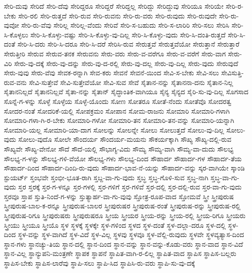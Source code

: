 {ಸೇರಿ-ದುವು
ಸೇರಿದೆ
ಸೇರಿ-ದೆವು
ಸೇರಿದ್ದರೂ
ಸೇರಿದ್ದರೆ
ಸೇರಿದ್ದಲ್ಲ
ಸೇರಿದ್ದು
ಸೇರಿದ್ದುವು
ಸೇರಿಯೂ
ಸೇರಿಯೇ
ಸೇರಿ-ರ-ಬೇಕು
ಸೇರಿ-ರಲಿ
ಸೇರಿ-ರುತ್ತದೆ
ಸೇರಿ-ರುವ
ಸೇರಿ-ರುವನು
ಸೇರಿ-ರು-ವರು
ಸೇರಿ-ರುವುದು
ಸೇರಿ-ರುವುದೇ
ಸೇರಿ-ರು-ವುವೋ
ಸೇರಿ-ರು-ವೆವು
ಸೇರಿಲ್ಲ
ಸೇರಿಲ್ಲ-ವೆಂದು
ಸೇರಿವೆ
ಸೇರಿ-ಸ-ಬಹುದು
ಸೇರಿ-ಸ-ಲಾರಿರಿ
ಸೇರಿ-ಸಲು
ಸೇರಿಸಿ
ಸೇರಿ-ಸಿ-ಕೊಳ್ಳಲು
ಸೇರಿ-ಸಿ-ಕೊಳ್ಳು-ವಷ್ಟು
ಸೇರಿ-ಸಿ-ಕೊಳ್ಳು-ವು-ದಿಲ್ಲ
ಸೇರಿ-ಸಿ-ಕೊಳ್ಳು-ವುದು
ಸೇರಿ-ಸಿ-ದಂತಿ-ರುತ್ತದೆ
ಸೇರಿ-ಸಿ-ದಂತೆ
ಸೇರಿ-ಸಿ-ದರು
ಸೇರಿ-ಸಿ-ದರೂ
ಸೇರಿ-ಸಿ-ದರೆ
ಸೇರಿಸಿ-ರುವ
ಸೇರುತ್ತವೆ
ಸೇರುತ್ತವೆಯೋ
ಸೇರುತ್ತಾನೆ
ಸೇರುತ್ತಾರೆ
ಸೇರುತ್ತೀರಿ
ಸೇರುವ
ಸೇರುವ-ತನಕ
ಸೇರುವನು
ಸೇರು-ವರು
ಸೇರು-ವ-ವರೆಗೂ
ಸೇರು-ವ-ವರೆಗೆ
ಸೇರು-ವಾಗ
ಸೇರು-ವಿರಿ
ಸೇರು-ವು-ದಕ್ಕೆ
ಸೇರು-ವು-ದನ್ನು
ಸೇರು-ವು-ದ-ರಲ್ಲಿ
ಸೇರು-ವು-ದಲ್ಲ
ಸೇರು-ವು-ದಿಲ್ಲ
ಸೇರು-ವುದು
ಸೇರುವುದೆ
ಸೇರು-ವುವು
ಸೇರು-ವೆವು
ಸೇವಕ-ರನ್ನಾಗಿ
ಸೇವ-ಕರು
ಸೇವನೆ
ಸೇವನೆ-ಯಿಂದ
ಸೇವಿ-ಸ-ಬೇಕು
ಸೇವಿ-ಸಲು
ಸೇವಿಸುತ್ತಿ-ರುವ-ವನು
ಸೇವಿ-ಸುತ್ತೇವೆ
ಸೇವಿ-ಸುತ್ತೇವೆಯೋ
ಸೇವಿ-ಸುವ
ಸೇವೆ
ಸೈತಾನ-ನನ್ನು
ಸೈತಾನನಾ-ದನು
ಸೈತಾನ-ನಿಲ್ಲ
ಸೈತಾನನಿಲ್ಲದೆ
ಸೈತಾನನಿಲ್ಲವೆ
ಸೈತಾ-ನನ್ನು
ಸೈತಾನ್
ಸೈದ್ಧಾಂತಿಕ-ವಾಗಿಯೂ
ಸೈನ್ಯ
ಸೈನ್ಯದ
ಸೈರಿ-ಸು-ವು-ದಿಲ್ಲ
ಸೊಗಸಾದ
ಸೊನ್ನೆ-ಗ-ಳನ್ನು
ಸೊಳ್ಳೆ
ಸೊಳ್ಳೆಯ
ಸೊಳ್ಳೆ-ಯೊಂದು
ಸೋಣ
ಸೋತರೂ
ಸೋತೆ-ನೆಂದು
ಸೋತೆವೊ
ಸೋದರತ್ವ
ಸೋದರ-ನಂತೆ
ಸೋದರಿಕೆ-ಯಲ್ಲಿ
ಸೋಪಕ್ರಮಂ
ಸೋಪಾನ
ಸೋಮ-ರಾಜನು
ಸೋಮಾರಿ
ಸೋಮಾರಿ-ಗಳಾಗಿ
ಸೋಮಾರಿ-ಗಳಾ-ಗಿ-ರ-ಬೇಕು
ಸೋಮಾರಿ-ಗಳೋ
ಸೋಮಾರಿ-ತನ
ಸೋಮಾರಿ-ತನ-ವನ್ನು
ಸೋಮಾರಿ-ಯನ್ನಾಗಿ
ಸೋಮಾರಿ-ಯಲ್ಲ
ಸೋಮಾರಿ-ಯಾ-ದಾಗ
ಸೋಲನ್ನು
ಸೋಲನ್ನೇ
ಸೋಲು
ಸೋಲುತ್ತದೆ
ಸೋಲು-ವು-ದಿಲ್ಲ
ಸೋಲು-ವುದು
ಸೋಲು-ವುದೊ
ಸೋಲೇ
ಸೌಂದರ್ಯ
ಸೌಂದರ್ಯ-ಮಯನು
ಸೌಕರ್ಯಕ್ಕಾಗಿ
ಸೌಖ್ಯ
ಸೌಖ್ಯ-ದಲ್ಲಿ-ರುವ
ಸೌಖ್ಯವೇ
ಸೌಖ್ಯ-ವೇನೋ
ಸೌದೆ
ಸೌದೆ-ಯಲ್ಲಿ
ಸೌಭಾಗ್ಯ-ವಿದು
ಸೌಮ್ಯ
ಸೌಮ್ಯ-ವಾಗಿ
ಸೌಮ್ಯ-ವಾ-ದುದು
ಸೌಲಭ್ಯ
ಸೌಲಭ್ಯ-ಗ-ಳನ್ನು
ಸೌಲಭ್ಯ-ಗಳಿ-ವೆಯೋ
ಸೌಲಭ್ಯ-ಗಳು
ಸೌಲಭ್ಯ-ದಿಂದ
ಸೌಹಾರ್ದ
ಸೌಹಾರ್ದ-ಗಳ
ಸೌಹಾರ್ದ-ತೆಯ
ಸೌಹಾರ್ದ-ದಿಂದ
ಸೌಹಾರ್ದ-ದಿಂದಿ-ರು-ವುದು
ಸೌಹಾರ್ದ-ಭಾವ-ನೆ-ಯನ್ನು
ಸೌಹಾರ್ದ-ವನ್ನು
ಸ್ಕರ-ವಾಗಿಯೇ
ಸ್ಕಾಂಡಿ
ಸ್ಟುಯರ್ಟ್
ಸ್ತಂಭವೇ
ಸ್ತಂಭೀ-ಭೂತ-ರಾಗಿ
ಸ್ತಬ್ದ-ವಾ-ಗು-ವುದು
ಸ್ತಬ್ಧ
ಸ್ತಬ್ಧ-ಗೊಳಿ-ಸುವ
ಸ್ತಬ್ಧ-ನಾಗಿ
ಸ್ತಬ್ಧ-ವಾ-ಗು-ವುದು
ಸ್ತರ
ಸ್ತರಕ್ಕೆ
ಸ್ತರ-ಗ-ಳನ್ನೂ
ಸ್ತರ-ಗಳಲ್ಲಿ
ಸ್ತರ-ಗಳಿಗೆ
ಸ್ತರ-ಗಳಿವೆ
ಸ್ತರ-ದಲ್ಲಿ
ಸ್ತರ-ದಲ್ಲಿ-ರುವ
ಸ್ತರ-ವಾ-ಗು-ವುದು
ಸ್ತರವೂ
ಸ್ತಾಪ
ಸ್ತುತಿ-ನಿಂದೆ-ಗ-ಳನ್ನು
ಸ್ತುತ್ಯಾರ್ಹ-ವಾ-ಗು-ವುವು
ಸ್ತೋತ್ರ-ರೂಪ-ವಾದ
ಸ್ತೋಮವೆ
ಸ್ತ್ರೀ
ಸ್ತ್ರೀಪುರುಷ
ಸ್ತ್ರೀಪುರುಷ-ಬಾಲ-ಕ-ರನ್ನೂ
ಸ್ತ್ರೀಪುರುಷ-ಬಾಲರ
ಸ್ತ್ರೀಪುರುಷರ
ಸ್ತ್ರೀಪುರುಷ-ರಂತೆ
ಸ್ತ್ರೀಪುರುಷ-ರನ್ನು
ಸ್ತ್ರೀಪುರುಷ-ರಲ್ಲಿ
ಸ್ತ್ರೀಪುರುಷ-ರಿಗೂ
ಸ್ತ್ರೀಪುರುಷರು
ಸ್ತ್ರೀಪುರುಷರೂ
ಸ್ತ್ರೀಯ
ಸ್ತ್ರೀಯರ
ಸ್ತ್ರೀಯ-ರನ್ನು
ಸ್ತ್ರೀಯ-ರಲ್ಲಿ
ಸ್ತ್ರೀಯ-ರಿಗೂ
ಸ್ತ್ರೀಯರು
ಸ್ತ್ರೀಯು
ಸ್ತ್ರೀಯೂ
ಸ್ತ್ರೀಯೊ
ಸ್ಥಳ
ಸ್ಥಳಕ್ಕೆ
ಸ್ಥಳಕ್ಕೇ
ಸ್ಥಳ-ಗಳಿಂದ
ಸ್ಥಳದ
ಸ್ಥಳ-ದಂತೆ
ಸ್ಥಳ-ದಲ್ಲಾ-ದರೂ
ಸ್ಥಳ-ದಲ್ಲಿ
ಸ್ಥಳ-ದಿಂದ
ಸ್ಥಳ-ವನ್ನು
ಸ್ಥಳ-ವಾಗಿದೆ
ಸ್ಥಳ-ವಿದೆ
ಸ್ಥಳ-ವಿಲ್ಲ
ಸ್ಥಳವು
ಸ್ಥಳವೂ
ಸ್ಥಳ-ವೆಲ್ಲಿ-ರುವುದು
ಸ್ಥಳವೇ
ಸ್ಥಳವ್ಯತ್ಯಾಸ-ದಿಂದ
ಸ್ಥಾನ-ಗಳು
ಸ್ಥಾನಚ್ಯು-ತಿಯ
ಸ್ಥಾನ-ದಲ್ಲಿ
ಸ್ಥಾನ-ದಿಂದ
ಸ್ಥಾನ-ವನ್ನು
ಸ್ಥಾನ-ವನ್ನು-ಕೊಡು-ವರು
ಸ್ಥಾನ-ವಾದ
ಸ್ಥಾನ-ವಿದೆ
ಸ್ಥಾನ-ವಿಲ್ಲ
ಸ್ಥಾನ್ಯುಪನಿ-ಮಂತ್ರಣೇ
ಸ್ಥಾಪಕ
ಸ್ಥಾಪನೆ
ಸ್ಥಾಪಿತ-ವಾಗಿ-ರ-ಲಿಲ್ಲ
ಸ್ಥಾಪಿತ-ವಾದ
ಸ್ಥಾಪಿಸ
ಸ್ಥಾಪಿಸ-ಬಲ್ಲರು
ಸ್ಥಾಪಿಸ-ಬೇಕು
ಸ್ಥಾಪಿಸ-ಲಾರೆವು
ಸ್ಥಾಪಿ-ಸಲು
ಸ್ಥಾಪಿ-ಸಿದ
ಸ್ಥಾಪಿಸಿ-ರು-ವರು
ಸ್ಥಾಪಿ-ಸು-ವು-ದಕ್ಕೆ
}
